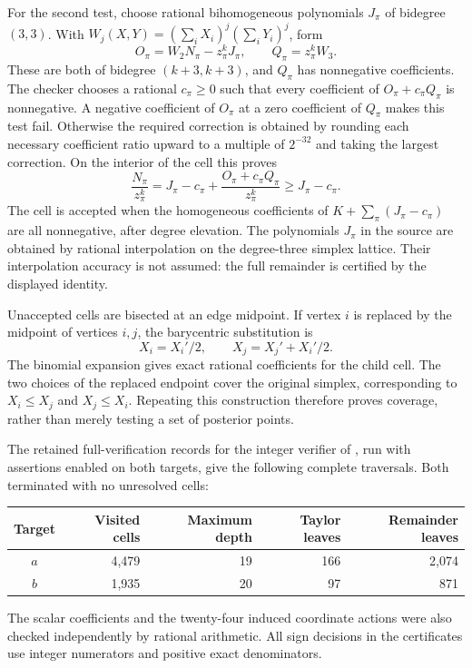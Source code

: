 For the second test, choose rational bihomogeneous polynomials $J_\pi$ of
bidegree $(3,3)$.  With
$W_j(X,Y)=(\sum_iX_i)^j(\sum_iY_i)^j$, form
\[
 O_\pi=W_2N_\pi-z_\pi^kJ_\pi,
 \qquad Q_\pi=z_\pi^kW_3.
\]
These are both of bidegree $(k+3,k+3)$, and $Q_\pi$ has nonnegative
coefficients.  The checker chooses a rational $c_\pi\ge0$ such that every
coefficient of $O_\pi+c_\pi Q_\pi$ is nonnegative.  A negative coefficient
of $O_\pi$ at a zero coefficient of $Q_\pi$ makes this test fail.  Otherwise
the required correction is obtained by rounding each necessary coefficient
ratio upward to a multiple of $2^{-32}$ and taking the largest correction.
On the interior of the cell this proves
\[
 \frac{N_\pi}{z_\pi^k}
 =J_\pi-c_\pi+
   \frac{O_\pi+c_\pi Q_\pi}{z_\pi^k}
 \ge J_\pi-c_\pi.
\]
The cell is accepted when the homogeneous coefficients of
$K+\sum_\pi(J_\pi-c_\pi)$ are all nonnegative, after degree elevation.
The polynomials $J_\pi$ in the source are obtained by rational interpolation
on the degree-three simplex lattice.  Their interpolation accuracy is not
assumed: the full remainder is certified by the displayed identity.

Unaccepted cells are bisected at an edge midpoint.  If vertex $i$ is
replaced by the midpoint of vertices $i,j$, the barycentric substitution is
\[
 X_i=X_i'/2,\qquad X_j=X_j'+X_i'/2.
\]
The binomial expansion gives exact rational coefficients for the child
cell.  The two choices of the replaced endpoint cover the original
simplex, corresponding to $X_i\le X_j$ and $X_j\le X_i$.  Repeating this
construction therefore proves coverage, rather than merely testing a set
of posterior points.

The retained full-verification records for the integer verifier of
\cite{OpenAI4}, run with assertions enabled on both targets, give the
following complete traversals.  Both terminated with no unresolved cells:
\begin{center}
\begin{tabular}{crrrr}
\hline
Target & Visited cells & Maximum depth & Taylor leaves & Remainder leaves\\
\hline
$a$ & 4,479 & 19 & 166 & 2,074\\
$b$ & 1,935 & 20 & 97 & 871\\
\hline
\end{tabular}
\end{center}
The scalar coefficients and the twenty-four induced coordinate actions were
also checked independently by rational arithmetic.  All sign decisions in
the certificates use integer numerators and positive exact denominators.

